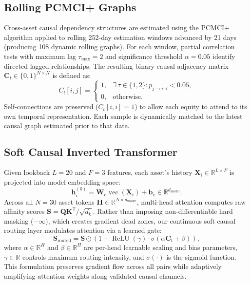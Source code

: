 \documentclass[10pt,twocolumn,a4paper]{article}
\begin{document}
\subsection{Rolling PCMCI+ Graphs}
Cross-asset causal dependency structures are estimated using the PCMCI+ algorithm \cite{runge2020} applied to rolling 252-day estimation windows advanced by 21 days (producing 108 dynamic rolling graphs). For each window, partial correlation tests with maximum lag $\tau_{\max} = 2$ and significance threshold $\alpha = 0.05$ identify directed lagged relationships. The resulting binary causal adjacency matrix $\mathbf{C}_t \in \{0, 1\}^{N \times N}$ is defined as:
\begin{equation}
C_t[i, j] = \begin{cases}
1, & \exists\,\tau \in \{1, 2\}: p_{j \to i, \tau} < 0.05, \\
0, & \text{otherwise}.
\end{cases}
\end{equation}
Self-connections are preserved ($C_t[i, i] = 1$) to allow each equity to attend to its own temporal representation. Each sample is dynamically matched to the latest causal graph estimated prior to that date.

\subsection{Soft Causal Inverted Transformer}
Given lookback $L = 20$ and $F = 3$ features, each asset's history $\mathbf{X}_i \in \mathbb{R}^{L \times F}$ is projected into model embedding space:
\begin{equation}
\mathbf{h}_i^{(0)} = \mathbf{W}_e \operatorname{vec}(\mathbf{X}_i) + \mathbf{b}_e \in \mathbb{R}^{d_{\mathrm{model}}}.
\end{equation}
Across all $N = 30$ asset tokens $\mathbf{H} \in \mathbb{R}^{N \times d_{\mathrm{model}}}$, multi-head attention computes raw affinity scores $\mathbf{S} = \mathbf{Q}\mathbf{K}^{\mathsf{T}}/\sqrt{d_k}$. Rather than imposing non-differentiable hard masking ($-\infty$), which creates gradient dead zones, our continuous soft causal routing layer modulates attention via a learned gate:
\begin{equation}
\mathbf{S}_{\mathrm{routed}} = \mathbf{S} \odot (1 + \operatorname{ReLU}(\gamma) \cdot \sigma(\alpha \mathbf{C}_t + \beta)),
\end{equation}
where $\alpha \in \mathbb{R}^H$ and $\beta \in \mathbb{R}^H$ are per-head learnable scaling and bias parameters, $\gamma \in \mathbb{R}$ controls maximum routing intensity, and $\sigma(\cdot)$ is the sigmoid function. This formulation preserves gradient flow across all pairs while adaptively amplifying attention weights along validated causal channels.
\end{document}
